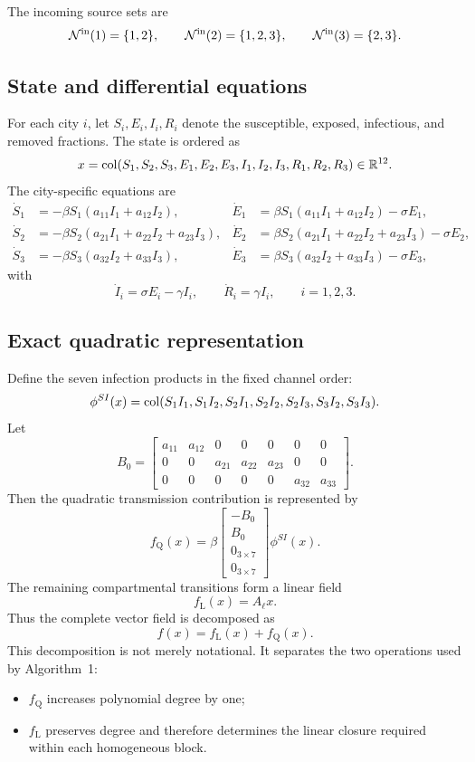 The incoming source sets are
\[
\mathcal{N}^{\mathrm{in}}(1)=\{1,2\},
\qquad
\mathcal{N}^{\mathrm{in}}(2)=\{1,2,3\},
\qquad
\mathcal{N}^{\mathrm{in}}(3)=\{2,3\}.
\]

\subsection{State and differential equations}

For each city $i$, let $S_i,E_i,I_i,R_i$ denote the susceptible, exposed,
infectious, and removed fractions. The state is ordered as
\[
x=\operatorname{col}
(S_1,S_2,S_3,E_1,E_2,E_3,I_1,I_2,I_3,R_1,R_2,R_3)
\in\mathbb{R}^{12}.
\]
The city-specific equations are
\[
\begin{aligned}
\dot S_1
&=-\beta S_1(a_{11}I_1+a_{12}I_2),
&
\dot E_1
&=\beta S_1(a_{11}I_1+a_{12}I_2)-\sigma E_1,\\
\dot S_2
&=-\beta S_2(a_{21}I_1+a_{22}I_2+a_{23}I_3),
&
\dot E_2
&=\beta S_2(a_{21}I_1+a_{22}I_2+a_{23}I_3)-\sigma E_2,\\
\dot S_3
&=-\beta S_3(a_{32}I_2+a_{33}I_3),
&
\dot E_3
&=\beta S_3(a_{32}I_2+a_{33}I_3)-\sigma E_3,
\end{aligned}
\]
with
\[
\dot I_i=\sigma E_i-\gamma I_i,
\qquad
\dot R_i=\gamma I_i,
\qquad i=1,2,3.
\]

\subsection{Exact quadratic representation}

Define the seven infection products in the fixed channel order:
\[
\phi^{SI}(x)=\operatorname{col}(
S_1I_1,S_1I_2,
S_2I_1,S_2I_2,S_2I_3,
S_3I_2,S_3I_3).
\]
Let
\[
B_0=
\begin{bmatrix}
 a_{11} & a_{12} & 0 & 0 & 0 & 0 & 0\\
 0 & 0 & a_{21} & a_{22} & a_{23} & 0 & 0\\
 0 & 0 & 0 & 0 & 0 & a_{32} & a_{33}
\end{bmatrix}.
\]
Then the quadratic transmission contribution is represented by
\[
f_{\mathrm Q}(x)
=
\beta
\begin{bmatrix}
-B_0\\
 B_0\\
 0_{3\times7}\\
 0_{3\times7}
\end{bmatrix}
\phi^{SI}(x).
\]
The remaining compartmental transitions form a linear field
\[
f_{\mathrm L}(x)=A_{\ell}x.
\]
Thus the complete vector field is decomposed as
\[
f(x)=f_{\mathrm L}(x)+f_{\mathrm Q}(x).
\]
This decomposition is not merely notational. It separates the two operations
used by Algorithm~1:

\begin{itemize}[leftmargin=2em]
\item $f_{\mathrm Q}$ increases polynomial degree by one;
\item $f_{\mathrm L}$ preserves degree and therefore determines the linear
      closure required within each homogeneous block.
\end{itemize}
